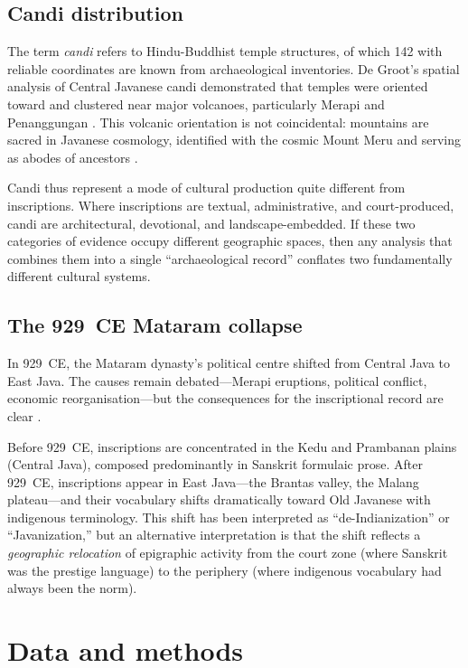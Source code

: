 \documentclass[12pt]{article}
\begin{document}
\subsection{Candi distribution}

The term \textit{candi} refers to Hindu-Buddhist temple structures, of which 142 with reliable coordinates are known from archaeological inventories.
De Groot's spatial analysis of Central Javanese candi demonstrated that temples were oriented toward and clustered near major volcanoes, particularly Merapi and Penanggungan \citep{Degroot2009}.
This volcanic orientation is not coincidental: mountains are sacred in Javanese cosmology, identified with the cosmic Mount Meru and serving as abodes of ancestors \citep{Dumarcay1986, Kinney2003}.

Candi thus represent a mode of cultural production quite different from inscriptions.
Where inscriptions are textual, administrative, and court-produced, candi are architectural, devotional, and landscape-embedded.
If these two categories of evidence occupy different geographic spaces, then any analysis that combines them into a single ``archaeological record'' conflates two fundamentally different cultural systems.

\subsection{The 929~CE Mataram collapse}

In 929~CE, the Mataram dynasty's political centre shifted from Central Java to East Java.
The causes remain debated---Merapi eruptions, political conflict, economic reorganisation---but the consequences for the inscriptional record are clear \citep{Christie1991, Hall2011}.

Before 929~CE, inscriptions are concentrated in the Kedu and Prambanan plains (Central Java), composed predominantly in Sanskrit formulaic prose.
After 929~CE, inscriptions appear in East Java---the Brantas valley, the Malang plateau---and their vocabulary shifts dramatically toward Old Javanese with indigenous terminology.
This shift has been interpreted as ``de-Indianization'' or ``Javanization,'' but an alternative interpretation is that the shift reflects a \emph{geographic relocation} of epigraphic activity from the court zone (where Sanskrit was the prestige language) to the periphery (where indigenous vocabulary had always been the norm).


\section{Data and methods}
\end{document}
